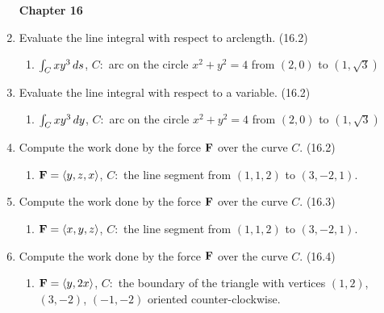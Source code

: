\begin{enumerate}
  \newpage
  \centerline{\bf Chapter 16}

    \item Evaluate the line integral with respect to arclength. (16.2)

      \begin{enumerate}
        \item $\int_C xy^3\,d{s}$, $C:$ arc on the circle $x^2+y^2=4$ from $(2,0)$ to $(1,\sqrt{3})$
      \end{enumerate}

    \item Evaluate the line integral with respect to a variable. (16.2)

      \begin{enumerate}
        \item $\int_C xy^3\,d{y}$, $C:$ arc on the circle $x^2+y^2=4$ from $(2,0)$ to $(1,\sqrt{3})$
      \end{enumerate}

    \item Compute the work done by the force $\mathbf{F}$ over the curve $C$. (16.2) %

      \begin{enumerate}
        \item $\mathbf{F}=\left<y,z,x\right>$, $C:$ the line segment from $(1,1,2)$ to $(3,-2,1)$.
      \end{enumerate}

    \item Compute the work done by the force $\mathbf{F}$ over the curve $C$. (16.3) %

      \begin{enumerate}
        \item $\mathbf{F}=\left<x,y,z\right>$, $C:$ the line segment from $(1,1,2)$ to $(3,-2,1)$.
      \end{enumerate}

    \item Compute the work done by the force $\mathbf{F}$ over the curve $C$. (16.4) %

      \begin{enumerate}
        \item $\mathbf{F}=\left<y,2x\right>$, $C:$ the boundary of the triangle with vertices $(1,2)$, $(3,-2)$, $(-1,-2)$ oriented counter-clockwise.
      \end{enumerate}




\end{enumerate}
